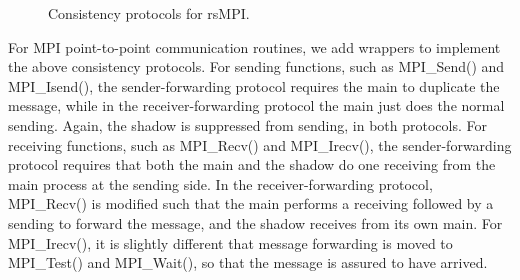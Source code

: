 \begin{figure}[!t]
  \begin{center}
  \end{center}
  \caption{Consistency protocols for rsMPI.}
  \label{fig:cons_protocol}
\end{figure}



For MPI point-to-point communication routines, we add wrappers to implement the above consistency protocols. For sending functions, such as MPI\_Send() and MPI\_Isend(), the sender-forwarding protocol requires the main to duplicate the message, while in the receiver-forwarding protocol the main just does the normal sending. Again, the shadow is suppressed from sending, in both protocols. For receiving functions, such as MPI\_Recv() and MPI\_Irecv(), the sender-forwarding protocol requires that both the main and the shadow do one receiving from the main process at the sending side. In the receiver-forwarding protocol, MPI\_Recv() is modified such that the main performs a receiving followed by a sending to forward the message, and the shadow receives from its own main. For MPI\_Irecv(), it is slightly different that message forwarding is moved to MPI\_Test() and MPI\_Wait(), so that the message is assured to have arrived.

